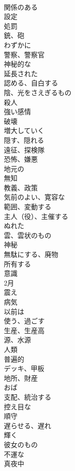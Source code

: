 \documentclass[8pt]{extreport}
\begin{document}
\begin{CJK}{UTF8}{min}
\\	関係のある	
\\	設定	
\\	処罰	
\\	銃、砲	
\\	わずかに	
\\	警察、警察官	
\\	神秘的な	
\\	延長された	
\\	認める、自白する	
\\	陰、光をさえぎるもの	
\\	殺人	
\\	強い感情	
\\	破壊	
\\	増大していく	
\\	隠す、隠れる	
\\	遠征、探検隊	
\\	恐怖、嫌悪	
\\	地元の	
\\	無知	
\\	教義、政策	
\\	気前のよい、寛容な	
\\	範囲、変動する	
\\	主人（役）、主催する	
\\	ぬれた	
\\	雲、雲状のもの	
\\	神秘	
\\	無駄にする、廃物	
\\	所有する	
\\	意識	
\\	2月	
\\	震え	
\\	病気	
\\	以前は	
\\	使う、過ごす	
\\	生産、生産高	
\\	源、水源	
\\	人類	
\\	普遍的	
\\	デッキ、甲板	
\\	地所、財産	
\\	おば	
\\	支配、統治する	
\\	控え目な	
\\	順守	
\\	遅らせる、遅れ	
\\	輝く	
\\	彼女のもの	
\\	不運な	
\\	真夜中	

\end{CJK}
\end{document}
